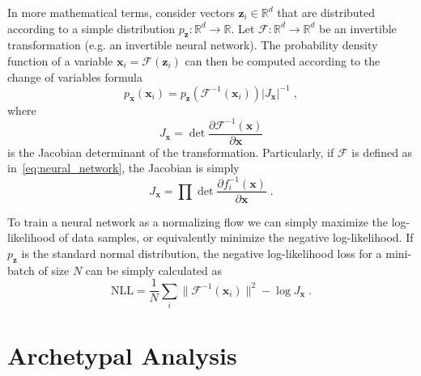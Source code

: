 In more mathematical terms, consider vectors $\mathbf{z}_i \in \mathbb{R}^d$
that are distributed according to a simple distribution $p_{\mathbf{z}}:
\mathbb{R}^d \rightarrow \mathbb{R}$. Let $\mathcal{F}: \mathbb{R}^d
\rightarrow \mathbb{R}^d$ be an invertible transformation (e.g. an invertible
neural network). The probability density function of a variable $\mathbf{x}_i =
\mathcal{F} (\mathbf{z}_i)$ can then be computed according to the change of
variables formula
\begin{equation}%
    \label{eq:change_of_variables}
    p_{\mathbf{x}}(\mathbf{x}_i) =
    p_{\mathbf{z}}(\mathcal{F}^{-1}(\mathbf{x}_i)) \lvert J_{\mathbf{x}}
    \rvert^{-1}\;,
\end{equation}
where
\begin{equation}%
    \label{eq:jacobian_det}
    J_{\mathbf{x}} = \det \frac{\partial \mathcal{F}^{-1} (\mathbf{x})}{\partial \mathbf{x}}
\end{equation}
is the Jacobian determinant of the transformation. Particularly, if
$\mathcal{F}$ is defined as in~\autoref{eq:neural_network}, the Jacobian is
simply
\begin{equation}%
    \label{eq:jacobian_chain_rule}
    J_{\mathbf{x}} = \prod \det \frac{\partial f_i^{-1} (\mathbf{x})}{\partial
    \mathbf{x}}\;.
\end{equation}

To train a neural network as a normalizing flow we can simply maximize the
log-likelihood of data samples, or equivalently minimize the negative
log-likelihood. If $p_{\mathbf{z}}$ is the standard normal
distribution, the negative log-likelihood loss for a mini-batch of size $N$ can
be simply calculated as
\begin{equation}%
    \label{eq:nll_loss}
    \mathrm{NLL} = \frac{1}{N} \sum_i \lVert \mathcal{F}^{-1} (\mathbf{x}_i)
    \rVert^2 - \log J_{\mathbf{x}}\;.
\end{equation}


\section{Archetypal Analysis}%
\label{sec:archetypal_analysis}

